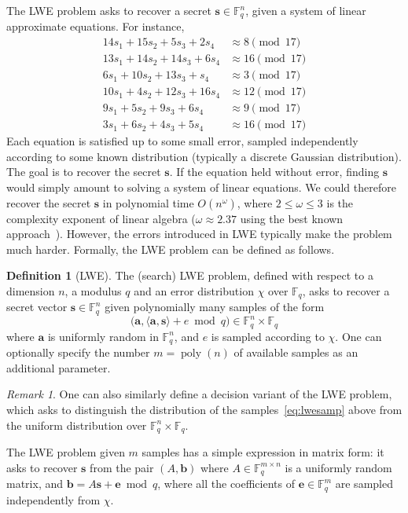 \documentclass[a4paper]{article}
\theoremstyle{definition}
\newtheorem{definition}{Definition}[section]
\theoremstyle{remark}
\newtheorem{remark}{Remark}[section]
\DeclareMathOperator{\poly}{poly}
\renewcommand{\vec}{\mathbf}
\newcommand{\F}{\mathbb{F}}
\begin{document}
The LWE problem asks to recover a secret $\vec s\in\F_q^n$, given a
system of linear approximate equations. For instance,
\begin{align*}
14 s_1 + 15 s_2 +  5 s_3 +  2 s_4 &\approx  8 \pmod{17} \\
13 s_1 + 14 s_2 + 14 s_3 +  6 s_4 &\approx 16 \pmod{17} \\
 6 s_1 + 10 s_2 + 13 s_3 +    s_4 &\approx  3 \pmod{17} \\
10 s_1 +  4 s_2 + 12 s_3 + 16 s_4 &\approx 12 \pmod{17} \\
 9 s_1 +  5 s_2 +  9 s_3 +  6 s_4 &\approx  9 \pmod{17} \\
 3 s_1 +  6 s_2 +  4 s_3 +  5 s_4 &\approx 16 \pmod{17} 
\end{align*}
Each equation is satisfied up to some small error, sampled independently
according to some known distribution (typically a discrete Gaussian
distribution). The goal is to recover the secret $\vec s$. If the
equation held without error, finding $\vec s$ would simply amount to
solving a system of linear equations. We could therefore recover the
secret $\vec s$ in polynomial time $O(n^\omega)$, where $2\leq\omega\leq
3$ is the complexity exponent of linear algebra ($\omega\approx 2.37$
using the best known approach~\cite{le2014powers}). However, the errors
introduced in LWE typically make the problem much harder. Formally, the
LWE problem can be defined as follows.

\begin{definition}[LWE]
\label{def:lwe}
The (search) LWE problem, defined with respect to a dimension $n$, a
modulus $q$ and an error distribution $\chi$ over $\F_q$, asks to recover
a secret vector $\vec s\in\F_q^n$ given polynomially many samples of the
form
\begin{equation}
\label{eq:lwesamp}
\big(\vec a, \langle\vec a, \vec s\rangle + e \bmod q\big) \in
\F_q^n\times \F_q
\end{equation}
where $\vec a$ is uniformly random in $\F_q^n$, and $e$ is sampled
according to $\chi$. One can optionally specify the number $m=\poly(n)$
of available samples as an additional parameter.
\end{definition}

\begin{remark}
One can also similarly define a decision variant of the LWE problem,
which asks to distinguish the distribution of the
samples~\eqref{eq:lwesamp} above from the uniform distribution over
$\F_q^n\times \F_q$.

The LWE problem given $m$ samples has a simple expression in matrix form:
it asks to recover $\vec s$ from the pair $(A,\vec b)$ where
$A\in\F_q^{m\times n}$ is a uniformly random matrix, and $\vec b = A\vec
s + \vec e\bmod q$, where all the coefficients of $\vec e\in \F_q^m$ are
sampled independently from $\chi$.
\end{remark}
\end{document}
